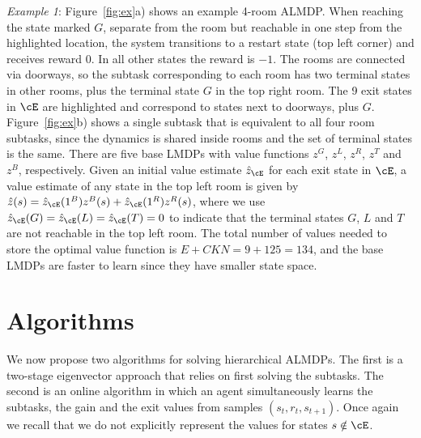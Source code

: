   \emph{Example 1}:
  Figure~\ref{fig:ex}a) shows an example 4-room ALMDP. When reaching the state marked $G$, separate from the room but reachable in one step from the highlighted location, the system transitions to a restart state (top left corner) and receives reward $0$. In all other states the reward is $-1$. The rooms are connected via doorways, so the subtask corresponding to each room has two terminal states in other rooms, plus the terminal state $G$ in the top right room. The 9 exit states in $\cE$ are highlighted and correspond to states next to doorways, plus $G$. Figure~\ref{fig:ex}b) shows a single subtask that is equivalent to all four room subtasks, since the dynamics is shared inside rooms and the set of terminal states is the same. %
    There are five base LMDPs with value functions $z^G$, $z^L$, $z^R$, $z^T$ and $z^B$, respectively. Given an initial value estimate $\hat{z}_\cE$ for each exit state in $\cE$, a value estimate of any state in the top left room is given by $\hat{z}(s)=\hat{z}_\cE(1^B) z^B(s) + \hat{z}_\cE(1^R) z^R(s)$, where we use $\hat{z}_\cE(G)=\hat{z}_\cE(L)=\hat{z}_\cE(T)=0$ to indicate that the terminal states $G$, $L$ and $T$ are not reachable in the top left room. 
    The total number of values needed to store the optimal value function is $E+CKN=9+125=134$, and the base LMDPs are faster to learn since they have smaller state space.


\section{Algorithms}
We now propose two algorithms for solving hierarchical ALMDPs. The first is a two-stage eigenvector approach that relies on first solving the subtasks. The second is an online algorithm in which an agent simultaneously learns the subtasks, the gain and the exit values from samples $(s_t, r_t, s_{t+1})$.
Once again we recall that we do not explicitly represent the values for states $s\notin\cE$.

